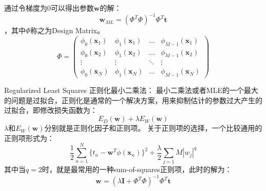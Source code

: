 \documentclass[paper=a4,fontsize=11pt]{xetexpNote}
\begin{document}
\begin{compactitem}[\color{RoyalBlue}$\circ$]
    通过令梯度为0可以得出参数$\mathbf{w}$的解：\[ \mathbf{w}_{ML} = (\Phi^T \Phi)^{-1} \Phi^T \mathbf{t} \]，其中$\Phi$称之为Design Matrix。
    \[ \Phi = 
        \begin{pmatrix}
            \phi_0(\mathbf{x}_1)&  \phi_1(\mathbf{x}_1)&  \ldots& \phi_{M-1}(\mathbf{x}_1)\\
            \phi_0(\mathbf{x}_2)&  \phi_1(\mathbf{x}_2)&  \ldots& \phi_{M-1}(\mathbf{x}_2)\\
            \vdots              &  \vdots              &  \ddots& \vdots                  \\
            \phi_0(\mathbf{x}_N)&  \phi_1(\mathbf{x}_N)&  \ldots& \phi_{M-1}(\mathbf{x}_N)
        \end{pmatrix} 
        \]

    \checkmark \textcolor[rgb]{1.00,0.00,0.00}{Regularized Least Squares 正则化最小二乘法}：
    最小二乘法或者MLE的一个最大的问题是过拟合，正则化是通常的一个解决方案，用来抑制估计的参数过大产生的过拟合，即修改损失函数为：
    \[ E_D(\mathbf{w}) + \lambda E_W(\mathbf{w}) \]
    $\lambda$和$E_W(\mathbf{w})$分别就是正则化因子和正则项。
    关于正则项的选择，一个比较通用的正则项形式为：
    \[ \frac{1}{2} \sum_{n=1}^{N} \{ t_n - \mathbf{w}^T \phi(\mathbf{x}_n) \} ^2 + \frac{\lambda}{2} \sum_{j=1}{M} |w_j|^q \]
    其中当$q=2$时，就是最常用的一种sum-of-squares正则项，此时的解为：
    \[ \mathbf{w} = (\lambda\mathbf{I} + \Phi^T \Phi)^{-1} \Phi^T \mathbf{t} \]

\end{compactitem}


%
\end{document}

